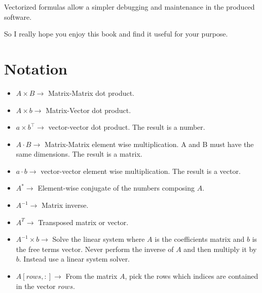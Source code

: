 \documentclass[nols,a4paper,twoside,notoc,fleqn]{tufte-book}
\begin{document}
Vectorized formulas allow a simpler debugging and maintenance in the produced software.

So I really hope you enjoy this book and find it useful for your purpose.

\chapter{Notation}
\begin{fullwidth}

\begin{multicols}{2}

\begin{itemize}
	
	\item $A \times B \rightarrow$ Matrix-Matrix dot product.
	
	\item $A \times b \rightarrow$ Matrix-Vector dot product.
	
	\item $a \times b^\top \rightarrow$ vector-vector dot product. The result is a number.
	
	\item $A \cdot B \rightarrow$ Matrix-Matrix element wise multiplication. A and B must have the same dimensions. The result is a matrix.
	
	\item $a \cdot b \rightarrow$ vector-vector element wise multiplication. The result is a vector.
	
	\item $A^{*}\rightarrow$ Element-wise conjugate of the numbers composing $A$.
	
	\item $A^{-1}\rightarrow$ Matrix inverse.
	
	\item $A^{T}\rightarrow$ Transposed matrix or vector.
	
	\item $A^{-1} \times b \rightarrow$ Solve the linear system where $A$ is the coefficients matrix and $b$ is the free terms vector. Never perform the inverse of $A$ and then multiply it by $b$. Instead use a linear system solver.
	
	\item $A[rows, :] \rightarrow$ From the matrix $A$, pick the rows which indices are contained in the vector $rows$.
	

\end{itemize}
\end{multicols}
\end{fullwidth}
\end{document}
